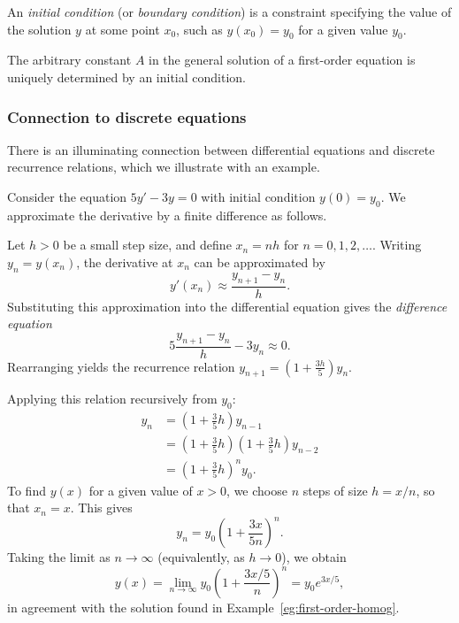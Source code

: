 \documentclass[a4paper]{article}
\begin{document}
\begin{defi}
  An \emph{initial condition} (or \emph{boundary condition}) is a constraint specifying the value of the solution $y$ at some point $x_0$, such as $y(x_0) = y_0$ for a given value $y_0$.
\end{defi}

\begin{remark}
  The arbitrary constant $A$ in the general solution of a first-order equation is uniquely determined by an initial condition.
\end{remark}

\subsubsection*{Connection to discrete equations}

\begin{remark}
  There is an illuminating connection between differential equations and discrete recurrence relations, which we illustrate with an example.
\end{remark}

\begin{eg}\label{eg:discrete-approx}
  Consider the equation $5y' - 3y = 0$ with initial condition $y(0) = y_0$. We approximate the derivative by a finite difference as follows.

  Let $h > 0$ be a small step size, and define $x_n = nh$ for $n = 0, 1, 2, \ldots$. Writing $y_n = y(x_n)$, the derivative at $x_n$ can be approximated by
  \[
    y'(x_n) \approx \frac{y_{n+1} - y_n}{h}.
  \]
  Substituting this approximation into the differential equation gives the \emph{difference equation}
  \[
    5\frac{y_{n+1} - y_n}{h} - 3y_n \approx 0.
  \]
  Rearranging yields the recurrence relation $y_{n+1} = \left(1 + \frac{3h}{5}\right)y_n$.

  Applying this relation recursively from $y_0$:
  \begin{align*}
    y_n &= \left(1 + \frac{3}{5}h\right)y_{n - 1}\\
    &= \left(1 + \frac{3}{5}h\right)\left(1 + \frac{3}{5}h\right)y_{n - 2}\\
    &= \left(1 + \frac{3}{5}h\right)^ny_0.
  \end{align*}
  To find $y(x)$ for a given value of $x > 0$, we choose $n$ steps of size $h = x/n$, so that $x_n = x$. This gives
  \[
    y_n = y_0\left(1 + \frac{3x}{5n}\right)^n.
  \]
  Taking the limit as $n \to \infty$ (equivalently, as $h \to 0$), we obtain
  \[
    y(x) = \lim_{n\to \infty} y_0\left(1 + \frac{3x/5}{n}\right)^n = y_0 e^{3x/5},
  \]
  in agreement with the solution found in Example~\ref{eg:first-order-homog}.
\end{eg}
\end{document}
